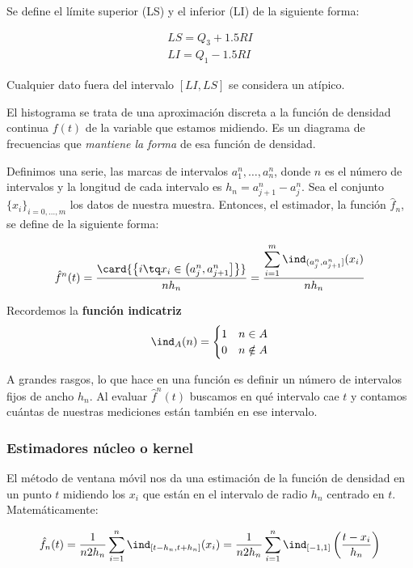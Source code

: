 \documentclass{apuntes}
\begin{document}
\begin{defn} Se define el límite superior (LS) y el inferior (LI) de la siguiente forma:

\begin{gather*}
LS = Q_3 + 1.5 RI \\
LI = Q_1 - 1.5 RI
\end{gather*}

Cualquier dato fuera del intervalo $[LI, LS]$ se considera un atípico.
\end{defn}

\begin{defn}[Histograma]
El histograma se trata de una aproximación discreta a la función de densidad continua $f(t)$ de la variable que estamos midiendo. Es un diagrama de frecuencias que \textit{mantiene la forma} de esa función de densidad.

Definimos una serie, las marcas de intervalos $a^n_1, \dotsc, a^n_n$, donde $n$ es el número de intervalos y la longitud de cada intervalo  es $h_n = a^n_{j+1} - a^n_j$. Sea el conjunto $\{x_i\}_{i=0,\dotsc,m}$ los datos de nuestra muestra. Entonces, el estimador, la función $\hat{f}_n$, se define de la siguiente forma:

\[ \hat{f}^n(t) = \frac{\card{\left\{i \tq x_i \in \left( a_j^n, a_{j+1}^n \right]\right\}}}{n h_n} = \frac{\displaystyle\sum_{i=1}^m \ind_{(a_j^n, a_{j+1}^n]} (x_i)}{n h_n} \]

Recordemos la \textbf{función indicatriz} \[ \ind_A (n) = \begin{cases} 1 & n \in A \\ 0 & n \notin A\end{cases}\]

A grandes rasgos, lo que hace en una función es definir un número de intervalos fijos de ancho $h_n$. Al evaluar $\hat{f}^n(t)$ buscamos en qué intervalo cae $t$ y contamos cuántas de nuestras mediciones están también en ese intervalo.


\end{defn}

\subsubsection{Estimadores núcleo o kernel}
\label{secEst}
\begin{defn}
El método de ventana móvil nos da una estimación de la función de densidad en un punto $t$ midiendo los $x_i$ que están en el intervalo de radio $h_n$ centrado en $t$. Matemáticamente:

\[ \hat{f}_n(t) = \frac{1}{n2h_n}\sum_{i=1}^n \ind_{[t-h_n, t+h_n]}(x_i) = \frac{1}{n2h_n}\sum_{i=1}^n \ind_{[-1,1]}\left(\frac{t-x_i}{h_n}\right) \]
\end{defn}
\end{document}
